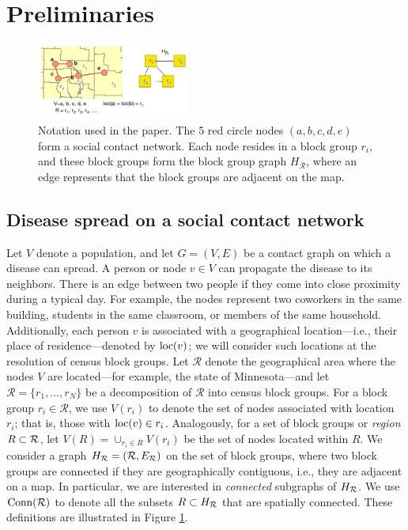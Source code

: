 \section{Preliminaries}
\label{sec:background}
\begin{figure}
\includegraphics[width=0.45\textwidth]{img/example.pdf}
\vspace{-.2in}
\caption{Notation used in the paper. The 5 red circle nodes $(a,b,c,d,e)$ form a social contact network. Each node resides in a block group $r_i$, and these block groups form the block group graph $H_\mathcal{R}$, where an edge represents that the block groups are adjacent on the map.}
\label{fig:definitions-example}
\end{figure}
\subsection{Disease spread on a social contact network}
Let $V$ denote a population, and let $G=(V, E)$ be a contact graph on which a disease can spread. A person or node $v \in V$ can propagate the disease to its neighbors. There is an edge between two people if they come into close proximity during a typical day. For example, the nodes represent two coworkers in the same building, students in the same classroom, or members of the same household. 
Additionally, %
each person $v$ is associated with a geographical location---i.e., their place of residence---denoted by $\text{loc}(v)$;
we will consider such locations at the resolution of census block groups.
Let $\mathcal{R}$ denote the geographical area where the nodes $V$ are located---for example, the state of Minnesota---and let $\mathcal{R}=\{r_1,\ldots,r_N\}$ be a decomposition of $\mathcal{R}$ into
census block groups. For a block group $r_i\in\mathcal{R}$, we use $V(r_i)$ to denote the
set of nodes associated with location $r_i$; that is, those with $\text{loc}(v)\in r_i$. Analogously, for a set of block groups or \emph{region} $R\subset \mathcal{R}$, let $V(R)=\cup_{r_i\in R} V(r_i)$ be the set of nodes located within $R$. We consider a graph $H_{\mathcal{R}}=(\mathcal{R}, E_{\mathcal{R}})$ on the set of block groups, where
two block groups are connected if they are geographically contiguous, i.e., they are adjacent on a map. In particular, we are interested in \emph{connected} subgraphs of $H_{\mathcal{R}}$. We use $\text{Conn}(\mathcal{R})$ to denote all the subsets $R\subset H_{\mathcal{R}}$ that are spatially connected. These definitions are illustrated in Figure \ref{fig:definitions-example}.

